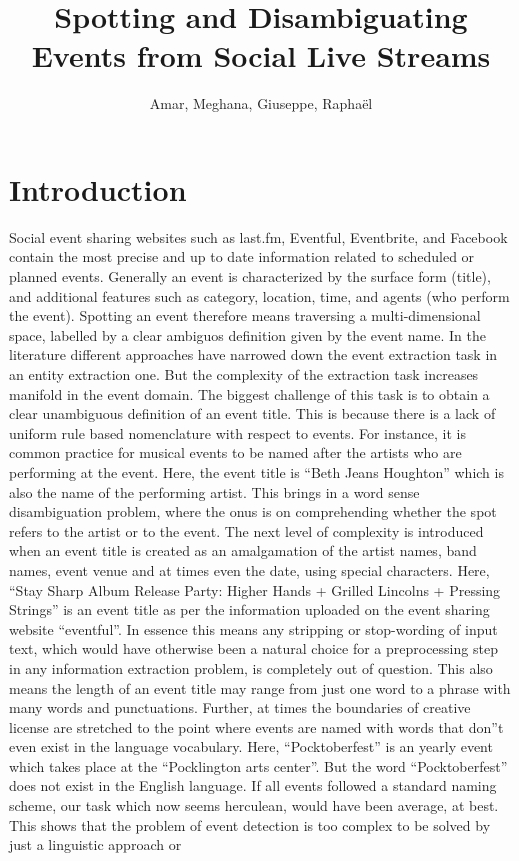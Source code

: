 \documentclass[10pt,a4paper]{article}
\author{Amar, Meghana, Giuseppe, Rapha\"el}
\title{Spotting and Disambiguating Events from Social Live Streams}
\begin{document}
\maketitle
\section{Introduction}
Social event sharing websites such as last.fm, Eventful, Eventbrite, and Facebook contain the most precise and up to date information related to scheduled or planned events. 
Generally an event is characterized by the surface form (title), and additional features such as category, location, time, and agents (who perform the event). Spotting an event therefore means traversing a multi-dimensional space, labelled by a clear ambiguos definition given by the event name. 
In the literature different approaches have narrowed down the event extraction task in an entity extraction one. But the complexity of the extraction task increases manifold in the event domain. The biggest challenge of this task is to obtain a clear unambiguous definition of an event title. This is because there is a lack of uniform rule based nomenclature with respect to events. \newline
{\color{red}{G:need to cut off the many examples, which are verbose}}\newline
For instance, it is common practice for musical events to be named after the artists who are performing at the event. Here, the event title is ``Beth Jeans Houghton'' which is also the name of the performing artist. This brings in a word sense disambiguation problem, where the onus is on comprehending whether the spot refers to the artist or to the event. The next level of complexity is introduced when an event title is created as an amalgamation of the artist names, band names, event venue and at times even the date, using special characters. Here, ``Stay Sharp Album Release Party: Higher Hands + Grilled Lincolns + Pressing Strings'' is an event title as per the information uploaded on the event sharing website ``eventful''. In essence this means any stripping or stop-wording of input text, which would have otherwise been a natural choice for a preprocessing step in any information extraction problem, is completely out of question. This also means the length of an event title may range from just one word to a phrase with many words and punctuations. Further, at times the boundaries of creative license are stretched to the point where events are named with words that don''t even exist in the language vocabulary. Here, ``Pocktoberfest'' is an yearly event which takes place at the ``Pocklington arts center''. But the word ``Pocktoberfest'' does not exist in the English language. If all events followed a standard naming scheme, our task which now seems herculean, would have been average, at best. This shows that the problem of event detection is too complex to be solved by just a linguistic approach or \newline
\end{document}
